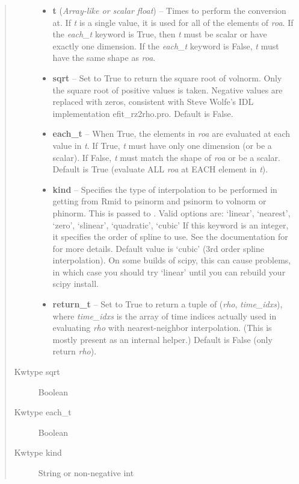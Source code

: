 \documentclass[letterpaper,10pt,english]{sphinxmanual}
\begin{document}
\begin{fulllineitems}
\begin{fulllineitems}
\begin{quote}
\begin{description}
\begin{itemize}
\item {} 
\textbf{t} (\emph{Array-like or scalar float}) -- Times to perform the conversion at.
If \emph{t} is a single value, it is used for all of the elements of
\emph{roa}. If the \emph{each\_t} keyword is True, then \emph{t} must be scalar
or have exactly one dimension. If the \emph{each\_t} keyword is False,
\emph{t} must have the same shape as \emph{roa}.

\item {} 
\textbf{sqrt} -- Set to True to return the square root of volnorm.
Only the square root of positive values is taken. Negative
values are replaced with zeros, consistent with Steve Wolfe's
IDL implementation efit\_rz2rho.pro. Default is False.

\item {} 
\textbf{each\_t} -- When True, the elements in \emph{roa} are evaluated
at each value in \emph{t}. If True, \emph{t} must have only one dimension
(or be a scalar). If False, \emph{t} must match the shape of \emph{roa}
or be a scalar. Default is True (evaluate ALL \emph{roa} at EACH
element in \emph{t}).

\item {} 
\textbf{kind} -- Specifies the type of
interpolation to be performed in getting from Rmid to
psinorm and psinorm to volnorm or phinorm. This is passed to
. Valid options are:
`linear', `nearest', `zero', `slinear', `quadratic', `cubic'
If this keyword is an integer, it specifies the order of spline
to use. See the documentation for  for more
details. Default value is `cubic' (3rd order spline
interpolation). On some builds of scipy, this can cause problems,
in which case you should try `linear' until you can rebuild your
scipy install.

\item {} 
\textbf{return\_t} -- Set to True to return a tuple of (\emph{rho},
\emph{time\_idxs}), where \emph{time\_idxs} is the array of time indices
actually used in evaluating \emph{rho} with nearest-neighbor
interpolation. (This is mostly present as an internal helper.)
Default is False (only return \emph{rho}).

\end{itemize}

\item[{Kwtype sqrt}] \leavevmode
Boolean

\item[{Kwtype each\_t}] \leavevmode
Boolean

\item[{Kwtype kind}] \leavevmode
String or non-negative int


\end{description}
\end{quote}
\end{fulllineitems}
\end{fulllineitems}
\end{document}
